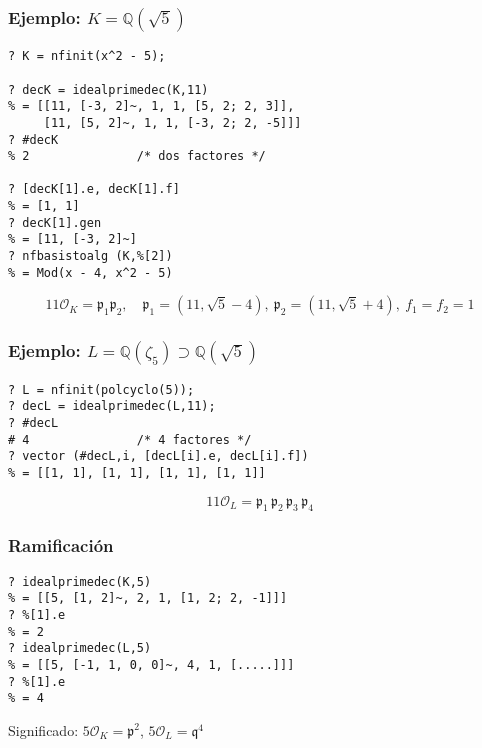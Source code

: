 \documentclass{beamer}
\newcommand{\QQ}{\mathbb{Q}}
\renewcommand{\O}{\mathcal{O}}
\begin{document}
\begin{frame}[fragile]
  \frametitle{Ejemplo: $K = \QQ (\sqrt{5})$}

  \begin{shaded}\footnotesize
\begin{verbatim}
? K = nfinit(x^2 - 5);

? decK = idealprimedec(K,11)
% = [[11, [-3, 2]~, 1, 1, [5, 2; 2, 3]],
     [11, [5, 2]~, 1, 1, [-3, 2; 2, -5]]]
? #decK
% 2               /* dos factores */

? [decK[1].e, decK[1].f]
% = [1, 1]
? decK[1].gen
% = [11, [-3, 2]~]
? nfbasistoalg (K,%[2])
% = Mod(x - 4, x^2 - 5)
\end{verbatim}
  \end{shaded}

  \[ 11\O_K = \mathfrak{p}_1 \mathfrak{p}_2, \quad
     \mathfrak{p}_1 = (11, \sqrt{5}-4), ~
     \mathfrak{p}_2 = (11, \sqrt{5}+4), ~
     f_1 = f_2 = 1 \]
\end{frame}


\begin{frame}[fragile]
  \frametitle{Ejemplo: $L = \QQ (\zeta_5) \supset \QQ (\sqrt{5})$}

  \begin{shaded}\footnotesize
\begin{verbatim}
? L = nfinit(polcyclo(5));
? decL = idealprimedec(L,11);
? #decL
# 4               /* 4 factores */
? vector (#decL,i, [decL[i].e, decL[i].f])
% = [[1, 1], [1, 1], [1, 1], [1, 1]]
\end{verbatim}
  \end{shaded}

  \[ 11\O_L = \mathfrak{p}_1\,\mathfrak{p}_2\,\mathfrak{p}_3\,\mathfrak{p}_4 \]
\end{frame}


\begin{frame}[fragile]
  \frametitle{Ramificación}

  \begin{shaded}\footnotesize
\begin{verbatim}
? idealprimedec(K,5)
% = [[5, [1, 2]~, 2, 1, [1, 2; 2, -1]]]
? %[1].e
% = 2
? idealprimedec(L,5)
% = [[5, [-1, 1, 0, 0]~, 4, 1, [.....]]]
? %[1].e
% = 4
\end{verbatim}
  \end{shaded}

  Significado: $5\O_K = \mathfrak{p}^2$, $5\O_L = \mathfrak{q}^4$
\end{frame}
\end{document}

